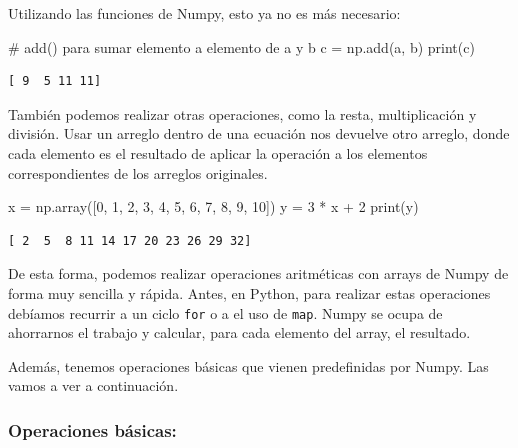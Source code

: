 \documentclass[
  letterpaper,
  DIV=11,
  numbers=noendperiod]{scrreprt}
\newenvironment{Shaded}{\begin{snugshade}}{\end{snugshade}}
\newcommand{\BuiltInTok}[1]{\textcolor[rgb]{0.00,0.23,0.31}{#1}}
\newcommand{\CommentTok}[1]{\textcolor[rgb]{0.37,0.37,0.37}{#1}}
\newcommand{\DecValTok}[1]{\textcolor[rgb]{0.68,0.00,0.00}{#1}}
\newcommand{\NormalTok}[1]{\textcolor[rgb]{0.00,0.23,0.31}{#1}}
\newcommand{\OperatorTok}[1]{\textcolor[rgb]{0.37,0.37,0.37}{#1}}
\begin{document}
Utilizando las funciones de Numpy, esto ya no es más necesario:

\begin{Shaded}
\begin{Highlighting}[]
\CommentTok{\# add() para sumar elemento a elemento de a y b}
\NormalTok{c }\OperatorTok{=}\NormalTok{ np.add(a, b)}
\BuiltInTok{print}\NormalTok{(c)}
\end{Highlighting}
\end{Shaded}

\begin{verbatim}
[ 9  5 11 11]
\end{verbatim}

También podemos realizar otras operaciones, como la resta,
multiplicación y división. Usar un arreglo dentro de una ecuación nos
devuelve otro arreglo, donde cada elemento es el resultado de aplicar la
operación a los elementos correspondientes de los arreglos originales.

\begin{Shaded}
\begin{Highlighting}[]
\NormalTok{x }\OperatorTok{=}\NormalTok{ np.array([}\DecValTok{0}\NormalTok{,  }\DecValTok{1}\NormalTok{, }\DecValTok{2}\NormalTok{, }\DecValTok{3}\NormalTok{, }\DecValTok{4}\NormalTok{, }\DecValTok{5}\NormalTok{, }\DecValTok{6}\NormalTok{, }\DecValTok{7}\NormalTok{, }\DecValTok{8}\NormalTok{, }\DecValTok{9}\NormalTok{, }\DecValTok{10}\NormalTok{])}
\NormalTok{y }\OperatorTok{=} \DecValTok{3} \OperatorTok{*}\NormalTok{ x }\OperatorTok{+} \DecValTok{2}
\BuiltInTok{print}\NormalTok{(y)}
\end{Highlighting}
\end{Shaded}

\begin{verbatim}
[ 2  5  8 11 14 17 20 23 26 29 32]
\end{verbatim}

De esta forma, podemos realizar operaciones aritméticas con arrays de
Numpy de forma muy sencilla y rápida. Antes, en Python, para realizar
estas operaciones debíamos recurrir a un ciclo \texttt{for} o a el uso
de \texttt{map}. Numpy se ocupa de ahorrarnos el trabajo y calcular,
para cada elemento del array, el resultado.

Además, tenemos operaciones básicas que vienen predefinidas por Numpy.
Las vamos a ver a continuación.

\subsubsection{Operaciones básicas:}\label{operaciones-buxe1sicas}
\end{document}
